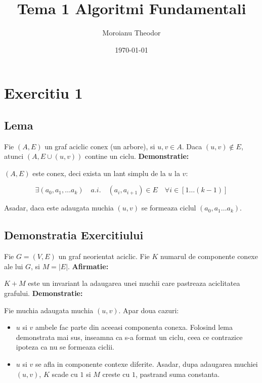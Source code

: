 \documentclass{article}
\title{Tema 1 Algoritmi Fundamentali}
\author{Moroianu Theodor}
\date{\today}
\begin{document}
\maketitle

\section*{Exercitiu 1}

\subsection*{Lema}
Fie $(A, E)$ un graf aciclic conex (un arbore), si $u, v \in A$.
\newline
Daca $(u, v) \not\in E$, atunci $(A, E \cup {(u, v)})$ contine un ciclu.
\newline
\textbf{Demonstratie:}

$(A, E)$ este conex, deci exista un lant simplu de la $u$ la $v$:

\begin{equation}
\exists (a_0, a_1, \dots a_k) \quad a.i.\quad (a_i, a_{i+1}) \in E \quad \forall i \in [1 \dots (k-1)]
\end{equation}

Asadar, daca este adaugata muchia $(u, v)$ se formeaza ciclul $(a_0, a_1 \dots a_k)$.

\subsection*{Demonstratia Exercitiului}
Fie $G = (V, E)$ un graf neorientat aciclic.
\newline
Fie $K$ numarul de componente conexe ale lui $G$, si $M = |E|$.
\newline
\textbf{Afirmatie:}

$K + M$ este un invariant la adaugarea unei muchii care pastreaza aciclitatea grafului.
\newline
\textbf{Demonstratie:}

Fie muchia adaugata muchia $(u, v)$.
\newline
Apar doua cazuri:
\begin{itemize}
    \item $u$ si $v$ ambele fac parte din aceeasi componenta conexa.
    \newline
    Folosind lema demonstrata mai sus, inseamna ca s-a format un ciclu, ceea ce contrazice ipoteza ca nu se formeaza ciclii.
    \item $u$ si $v$ se afla in componente contexe diferite.
    \newline
    Asadar, dupa adaugarea muchiei $(u, v)$, $K$ scade cu $1$ si $M$ creste cu $1$, pastrand suma constanta.
\end{itemize}
\end{document}
